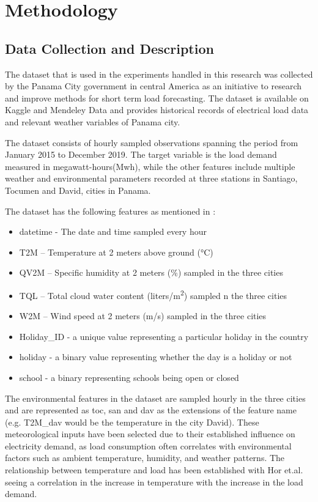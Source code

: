\chapter{Methodology}


\section{Data Collection and Description}
The dataset that is used in the experiments handled in this research was collected by the Panama City government in central America as an initiative to research and improve  methods for short term load forecasting. The dataset is available on Kaggle and  Mendeley Data and provides historical records of electrical load data and relevant weather variables of Panama city\cite{dataset}.

The dataset consists of hourly sampled observations spanning the period from January 2015 to December 2019. The target variable is the load demand measured in megawatt-hours(Mwh), while the other features include multiple weather and environmental parameters recorded at three stations in Santiago, Tocumen and David, cities in Panama. 

The dataset has the following features as mentioned in \cite{dataset}:
{\small
\begin{itemize}
	\item datetime - The date and time sampled every hour 
	\item T2M – Temperature at 2 meters above ground (°C)
	\item QV2M – Specific humidity at 2 meters (\%) sampled in the three cities
	\item TQL – Total cloud water content (liters/\si{m^2}) sampled n the three cities
	\item W2M – Wind speed at 2 meters (m/s) sampled in the three cities
	\item Holiday\_ID - a unique value representing a particular holiday in the country
	\item holiday - a binary value representing whether the day is a holiday or not
	\item school - a binary representing schools being open or closed 
	
\end{itemize}
}

The environmental features in the dataset are sampled hourly in the three cities and are represented as toc, san and dav as the extensions of the feature name (e.g. T2M\_dav would be the temperature in the city David). These meteorological inputs have been selected due to their established influence on electricity demand, as load consumption often correlates with environmental factors such as ambient temperature, humidity, and weather patterns. The relationship between temperature and load has been established with Hor et.al. \cite{hor2005analyzing} seeing a correlation in the increase in temperature with the increase in the load demand.

